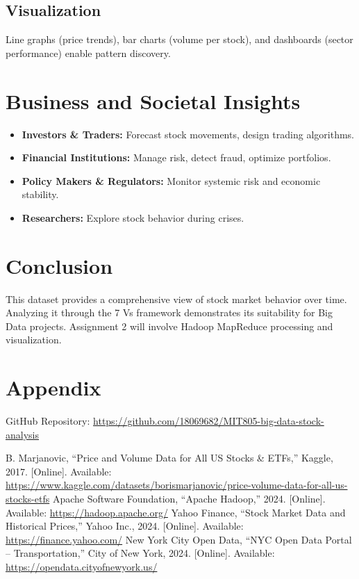 \documentclass[conference]{IEEEtran}
\begin{document}
\subsection{Visualization}
Line graphs (price trends), bar charts (volume per stock), and dashboards (sector performance) enable pattern discovery.

\section{Business and Societal Insights}
\begin{itemize}
    \item \textbf{Investors \& Traders:} Forecast stock movements, design trading algorithms.
    \item \textbf{Financial Institutions:} Manage risk, detect fraud, optimize portfolios.
    \item \textbf{Policy Makers \& Regulators:} Monitor systemic risk and economic stability.
    \item \textbf{Researchers:} Explore stock behavior during crises.
\end{itemize}

\section{Conclusion}
This dataset provides a comprehensive view of stock market behavior over time. Analyzing it through the 7 Vs framework demonstrates its suitability for Big Data projects. Assignment 2 will involve Hadoop MapReduce processing and visualization.

\section*{Appendix}
GitHub Repository: \url{https://github.com/18069682/MIT805-big-data-stock-analysis}



\begin{thebibliography}{00}
 B. Marjanovic, ``Price and Volume Data for All US Stocks \& ETFs,'' Kaggle, 2017. [Online]. Available: \url{https://www.kaggle.com/datasets/borismarjanovic/price-volume-data-for-all-us-stocks-etfs}
 Apache Software Foundation, ``Apache Hadoop,'' 2024. [Online]. Available: \url{https://hadoop.apache.org/}
 Yahoo Finance, ``Stock Market Data and Historical Prices,'' Yahoo Inc., 2024. [Online]. Available: \url{https://finance.yahoo.com/}
 New York City Open Data, ``NYC Open Data Portal – Transportation,'' City of New York, 2024. [Online]. Available: \url{https://opendata.cityofnewyork.us/}
\end{thebibliography}
\end{document}

